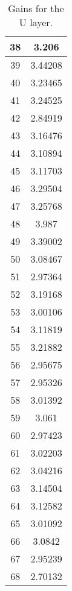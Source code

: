 \begin{table}[h]
\begin{subtable}[h]{2in}
{\begin{tabular}{|c|c|}
38	&	3.206	\\	\hline
39	&	3.44208	\\	\hline
40	&	3.23465	\\	\hline
41	&	3.24525	\\	\hline
42	&	2.84919	\\	\hline
43	&	3.16476	\\	\hline
44	&	3.10894	\\	\hline
45	&	3.11703	\\	\hline
46	&	3.29504	\\	\hline
47	&	3.25768	\\	\hline
48	&	3.987	\\	\hline
49	&	3.39002	\\	\hline
50	&	3.08467	\\	\hline
51	&	2.97364	\\	\hline
52	&	3.19168	\\	\hline
53	&	3.00106	\\	\hline
54	&	3.11819	\\	\hline
55	&	3.21882	\\	\hline
56	&	2.95675	\\	\hline
57	&	2.95326	\\	\hline
58	&	3.01392	\\	\hline
59	&	3.061	\\	\hline
60	&	2.97423	\\	\hline
61	&	3.02203	\\	\hline
62	&	3.04216	\\	\hline
63	&	3.14504	\\	\hline
64	&	3.12582	\\	\hline
65	&	3.01092	\\	\hline
66	&	3.0842	\\	\hline
67	&	2.95239	\\	\hline
68	&	2.70132	\\	\hline
        \end{tabular}
        }
        \caption{Gains for the U layer.}
    \end{subtable}
    \quad
    \begin{subtable}[h]{2in}
        \centering{}
\end{subtable}
\end{table}
